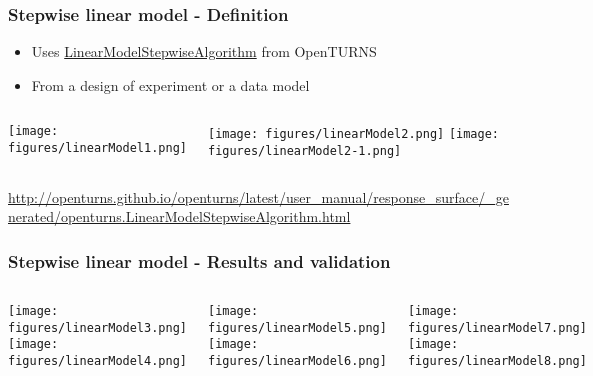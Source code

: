 \documentclass[aspectratio=169]{beamer}
\begin{document}
\begin{frame}
  \frametitle{Stepwise linear model - Definition}
  \begin{itemize}
    \item Uses \url{LinearModelStepwiseAlgorithm} from OpenTURNS
    \item From a design of experiment or a data model
  \end{itemize}

  \begin{columns}

    \begin{center}
      \texttt{[image: figures/linearModel1.png]}
    \end{center}

    \begin{center}
      \texttt{[image: figures/linearModel2.png]}
      \texttt{[image: figures/linearModel2-1.png]}
    \end{center}

  \end{columns}
  \begin{center}
    \vfill
    \tiny{\url{http://openturns.github.io/openturns/latest/user_manual/response_surface/_generated/openturns.LinearModelStepwiseAlgorithm.html}}
  \end{center}
\end{frame}


\begin{frame}
  \frametitle{Stepwise linear model - Results and validation}

  \begin{columns}

    \begin{center}
      \texttt{[image: figures/linearModel3.png]}
      \texttt{[image: figures/linearModel4.png]}
    \end{center}


    \begin{center}
      \texttt{[image: figures/linearModel5.png]}
      \texttt{[image: figures/linearModel6.png]}
    \end{center}


    \begin{center}
      \texttt{[image: figures/linearModel7.png]}
      \texttt{[image: figures/linearModel8.png]}
    \end{center}

  \end{columns}
\end{frame}
\end{document}
